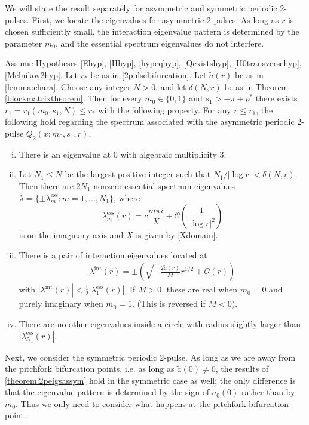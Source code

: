 \documentclass[thesis.tex]{subfiles}
\begin{document}
We will state the result separately for asymmetric and symmetric periodic 2-pulses. First, we locate the eigenvalues for asymmetric 2-pulses. As long as $r$ is chosen sufficiently small, the interaction eigenvalue pattern is determined by the parameter $m_0$, and the essential spectrum eigenvalues do not interfere.

\begin{theorem}\label{theorem:2peigsassym}
Assume Hypotheses \ref{Ehyp}, \ref{Hhyp}, \ref{hypeqhyp}, \ref{Qexistshyp}, \ref{H0transversehyp}, \ref{Melnikov2hyp}. Let $r_*$ be as in \cref{2pulsebifurcation}. Let $\tilde{a}(r)$ be as in \cref{lemma:chara}. Choose any integer $N > 0$, and let $\delta(N,r)$ be as in Theorem \ref{blockmatrixtheorem}. Then for every $m_0 \in \{0, 1\}$ and $s_1 > -\pi + p^*$ there exists $r_1 = r_1(m_0, s_1, N) \leq r_*$ with the following property. For any $r \leq r_1$, the following hold regarding the spectrum associated with the asymmetric periodic 2-pulse $Q_2(x; m_0, s_1, r)$.

\begin{enumerate}[(i)]
\item There is an eigenvalue at 0 with algebraic multiplicity 3. 
\item Let $N_1 \leq N$ be the largest positive integer such that $N_1/|\log r| < \delta(N,r)$. Then there are $2N_1$ nonzero essential spectrum eigenvalues $\lambda = \{ \pm \lambda_m^{\text{ess}} : m = 1, \dots, N_1 \}$, where
\[
\lambda_m^{\text{ess}}(r) = c \frac{m \pi i}{X}+  \mathcal{O}\left( \frac{1}{|\log r|^2} \right)
\]
is on the imaginary axis and $X$ is given by \cref{Xdomain}.

\item There is a pair of interaction eigenvalues located at
	\begin{align*}
	\lambda^{\text{int}}(r) = \pm \left( \sqrt{-\frac{2 \tilde{a}(r)}{M}}r^{1/2} + \mathcal{O}\left( r \right) \right)
	\end{align*}
with $|\lambda^{\text{int}}(r)| < \frac{1}{2}|\lambda_1^{\text{ess}}(r)|$. If $M > 0$, these are real when $m_0 = 0$ and purely imaginary when $m_0 = 1$. (This is reversed if $M < 0)$. 
\item There are no other eigenvalues inside a circle with radius slightly larger than $|\lambda_{N_1}^{\text{ess}}(r)|$.
\end{enumerate}
\end{theorem}

Next, we consider the symmetric periodic 2-pulse. As long as we are away from the pitchfork bifurcation points, i.e. as long as $\tilde{a}(0) \neq 0$, the results of \cref{theorem:2peigsassym} hold in the symmetric case as well; the only difference is that the eigenvalue pattern is determined by the sign of $\tilde{a}_0(0)$ rather than by $m_0$. Thus we only need to consider what happens at the pitchfork bifurcation point.
\end{document}
